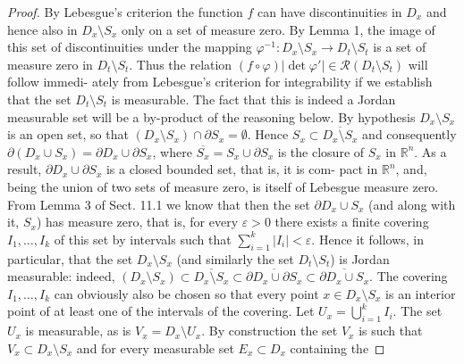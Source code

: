 \begin{proof}
By Lebesgue's criterion the function $f$ can have discontinuities in $D_x$ and
hence also in $D_x \setminus S_x$ only on a set of measure zero. By Lemma 1, the image of this
set of discontinuities under the mapping $\varphi^{-1} : D_x \setminus S_x \to D_t \setminus S_t$ is a set of measure
zero in $D_t \setminus S_t$. Thus the relation $(f \circ \varphi)|\det \varphi'| \in \mathcal{R}(D_t \setminus S_t)$ will follow immedi-
ately from Lebesgue's criterion for integrability if we establish that the set $D_t \setminus S_t$
is measurable. The fact that this is indeed a Jordan measurable set will be a by-product
of the reasoning below.
By hypothesis $D_x \setminus S_x$ is an open set, so that $(D_x \setminus S_x) \cap \partial S_x = \emptyset$. Hence $S_x \subset
\overline{D_x \setminus S_x}$ and consequently $\partial (D_x \cup S_x) = \partial D_x \cup \partial S_x$, where $\overline{S_x} = S_x \cup \partial S_x$ is the
closure of $S_x$ in $\mathbb{R}^n$. As a result, $\partial D_x \cup \partial S_x$ is a closed bounded set, that is, it is com-
pact in $\mathbb{R}^n$, and, being the union of two sets of measure zero, is itself of Lebesgue
measure zero. From Lemma 3 of Sect. 11.1 we know that then the set $\partial D_x \cup S_x$
(and along with it, $S_x$) has measure zero, that is, for every $\varepsilon > 0$ there exists a finite
covering $I_1, \ldots, I_k$ of this set by intervals such that $\sum_{i=1}^k |I_i| < \varepsilon$. Hence it follows,
in particular, that the set $D_x \setminus S_x$ (and similarly the set $D_t \setminus S_t$) is Jordan measurable:
indeed, $(D_x \setminus S_x) \subset \overline{D_x \setminus S_x} \subset \overline{\partial D_x \cup \partial S_x} \subset \overline{\partial D_x \cup S_x}$.
The covering $I_1, \ldots, I_k$ can obviously also be chosen so that every point $x \in
D_x \setminus S_x$ is an interior point of at least one of the intervals of the covering. Let
$U_x = \bigcup_{i=1}^k I_i$. The set $U_x$ is measurable, as is $V_x = D_x \setminus U_x$. By construction the set
$V_x$ is such that $V_x \subset D_x \setminus S_x$ and for every measurable set $E_x \subset D_x$ containing the
\end{proof}